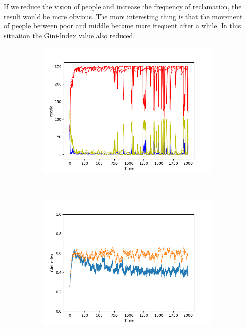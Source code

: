If we reduce the vision of people and increase the frequency of reclamation, the result would be more obvious. The more interesting thing is that the movement of people between poor and middle become more frequent after a while. In this situation the Gini-Index value also reduced.
\begin{figure}[h]
	\centering
	\begin{subfigure}[t]{0.5\textwidth}
		\centering
		\includegraphics[scale=0.5]{final.png}
	\end{subfigure}%
	~ 
	\begin{subfigure}[t]{0.5\textwidth}
		\centering
		\includegraphics[scale=0.5]{gini_index.png}
	\end{subfigure}
\end{figure}
